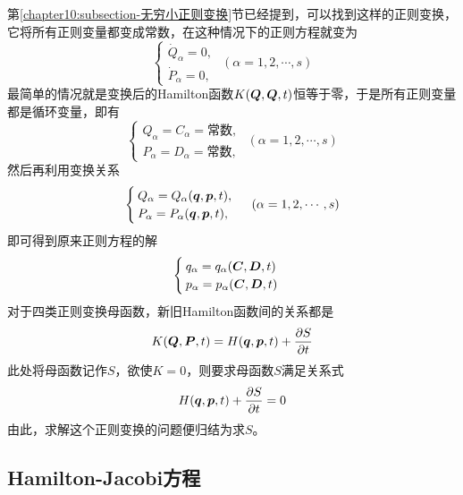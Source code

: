 第\ref{chapter10:subsection-无穷小正则变换}节已经提到，可以找到这样的正则变换，它将所有正则变量都变成常数，在这种情况下的正则方程就变为
\begin{equation}
	\begin{cases}
		\dot{Q}_\alpha = 0, \\
		\dot{P}_\alpha = 0,
	\end{cases}\,\, (\alpha = 1,2,\cdots,s)
\end{equation}
最简单的情况就是变换后的Hamilton函数$K(\boldsymbol{Q},\boldsymbol{Q},t)$恒等于零，于是所有正则变量都是循环变量，即有
\begin{equation}
	\begin{cases}
		Q_\alpha = C_\alpha = \text{常数}, \\
		P_\alpha = D_\alpha = \text{常数},
	\end{cases}\,\, (\alpha=1,2,\cdots,s)
\end{equation}
然后再利用变换关系
\begin{equation}
	\begin{cases}
		Q_\alpha = Q_\alpha(\boldsymbol{q},\boldsymbol{p},t), \\
		P_\alpha = P_\alpha(\boldsymbol{q},\boldsymbol{p},t),
	\end{cases}\,\, (\alpha = 1,2,\cdots,s)
\end{equation}
即可得到原来正则方程的解
\begin{equation}
	\begin{cases}
		q_\alpha = q_\alpha(\boldsymbol{C},\boldsymbol{D},t) \\
		p_\alpha = p_\alpha(\boldsymbol{C},\boldsymbol{D},t)
	\end{cases}
\end{equation}
对于四类正则变换母函数，新旧Hamilton函数间的关系都是
\begin{equation}
	K(\boldsymbol{Q},\boldsymbol{P},t) = H(\boldsymbol{q},\boldsymbol{p},t) + \frac{\partial S}{\partial t}
\end{equation}
此处将母函数记作$S$，欲使$K = 0$，则要求母函数$S$满足关系式
\begin{equation}
	H(\boldsymbol{q},\boldsymbol{p},t) + \frac{\partial S}{\partial t} = 0
\end{equation}
由此，求解这个正则变换的问题便归结为求$S$。

\subsection{Hamilton-Jacobi方程}

